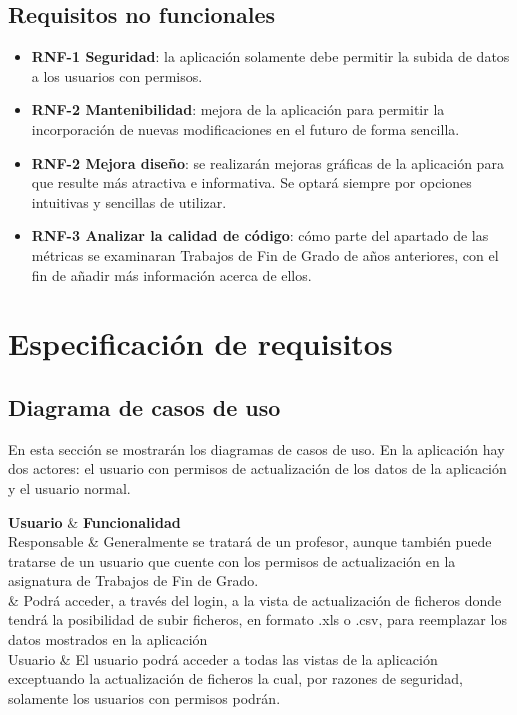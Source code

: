 \subsection{Requisitos no funcionales}
\begin{itemize}
	\item \textbf{RNF-1 Seguridad}: la aplicación solamente debe permitir la subida de datos a los usuarios con permisos.
	
	\item \textbf{RNF-2 Mantenibilidad}: mejora de la aplicación para permitir la incorporación de nuevas modificaciones en el futuro de forma sencilla. 
	
	\item \textbf{RNF-2 Mejora diseño}: se realizarán mejoras gráficas de la aplicación para que resulte más atractiva e informativa. Se optará siempre por opciones intuitivas y sencillas de utilizar.
	
	\item \textbf{RNF-3 Analizar la calidad de código}: cómo parte del apartado de las métricas se examinaran Trabajos de Fin de Grado de años anteriores, con el fin de añadir más información acerca de ellos.

\end{itemize}

\section{Especificación de requisitos}

\subsection{Diagrama de casos de uso}
En esta sección se mostrarán los diagramas de casos de uso. En la aplicación hay dos actores: el usuario con permisos de actualización de los datos de la aplicación y el usuario normal.

{\textbf{Usuario} & \textbf{Funcionalidad} \\}{
	Responsable & Generalmente se tratará de un profesor, aunque también puede tratarse de un usuario que cuente con los permisos de actualización en la asignatura de Trabajos de Fin de Grado. \\\hline
	& Podrá acceder, a través del login, a la vista de actualización de ficheros donde tendrá la posibilidad de subir ficheros, en formato .xls o .csv, para reemplazar los datos mostrados en la aplicación \\
	
	Usuario & El usuario podrá acceder a todas las vistas de la aplicación exceptuando la actualización de ficheros la cual, por razones de seguridad, solamente los usuarios con permisos podrán. \\
}

